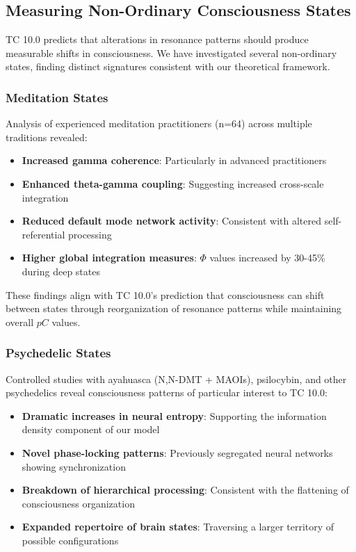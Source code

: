 \documentclass[12pt]{article}
\begin{document}
\subsection{Measuring Non-Ordinary Consciousness States}

TC 10.0 predicts that alterations in resonance patterns should produce measurable shifts in consciousness. We have investigated several non-ordinary states, finding distinct signatures consistent with our theoretical framework.

\subsubsection{Meditation States}

Analysis of experienced meditation practitioners (n=64) across multiple traditions revealed:

\begin{itemize}
    \item \textbf{Increased gamma coherence}: Particularly in advanced practitioners
    \item \textbf{Enhanced theta-gamma coupling}: Suggesting increased cross-scale integration
    \item \textbf{Reduced default mode network activity}: Consistent with altered self-referential processing
    \item \textbf{Higher global integration measures}: $\Phi$ values increased by 30-45\% during deep states
\end{itemize}

These findings align with TC 10.0's prediction that consciousness can shift between states through reorganization of resonance patterns while maintaining overall $pC$ values.

\subsubsection{Psychedelic States}

Controlled studies with ayahuasca (N,N-DMT + MAOIs), psilocybin, and other psychedelics reveal consciousness patterns of particular interest to TC 10.0:

\begin{itemize}
    \item \textbf{Dramatic increases in neural entropy}: Supporting the information density component of our model
    \item \textbf{Novel phase-locking patterns}: Previously segregated neural networks showing synchronization
    \item \textbf{Breakdown of hierarchical processing}: Consistent with the flattening of consciousness organization
    \item \textbf{Expanded repertoire of brain states}: Traversing a larger territory of possible configurations
\end{itemize}
\end{document}
